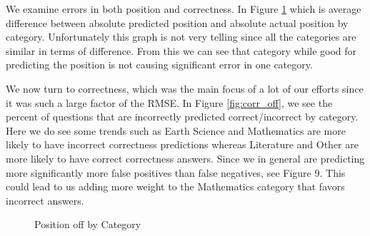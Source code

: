 \documentclass[letterpaper]{article}
\begin{document}
We examine errors in both position and correctness.  In Figure \ref{fig:abs_off} which is average difference between absolute predicted position and absolute actual position by category.  Unfortunately this graph is not very telling since all the categories are similar in terms of difference.  From this we can see that category while good for predicting the position is not causing significant error in one category.

We now turn to correctness, which was the main focus of a lot of our efforts since it was such a large factor of the RMSE.  In Figure \ref{fig:corr_off}, we see the percent of questions that are incorrectly predicted correct/incorrect by category.  Here we do see some trends such as Earth Science and Mathematics are more likely to have incorrect correctness predictions whereas Literature and Other are more likely to have correct correctness answers.  Since we in general are predicting more significantly more false positives than false negatives, see Figure 9.  This could lead to us adding more weight to the Mathematics category that favors incorrect answers.  



\begin{figure}[H]
	\begin{center}
	\end{center}
	\caption{Position off by Category}
	\label{fig:abs_off}
\end{figure}
\end{document}
